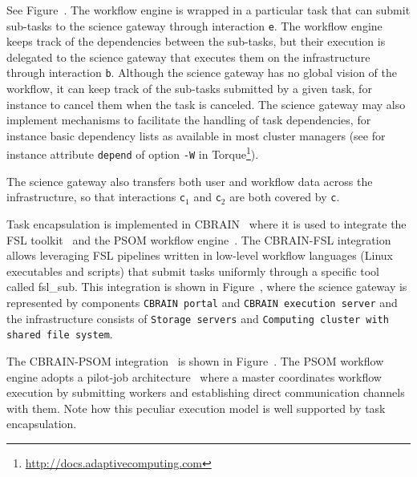 \documentclass[preprint,3p,twocolumn]{elsarticle}
\begin{document}
See Figure~. The workflow engine is wrapped in
a particular task that can submit sub-tasks to the science gateway
through interaction \texttt{e}. The workflow engine keeps track of the
dependencies between the sub-tasks, but their execution is delegated
to the science gateway that executes them on the infrastructure
through interaction \texttt{b}. Although the science gateway has no
global vision of the workflow, it can keep track of the sub-tasks
submitted by a given task, for instance to cancel them when
the task is canceled. The science gateway may also implement
mechanisms to facilitate the handling of task dependencies, for
instance basic dependency lists as available in most cluster managers
(see for instance attribute \texttt{depend} of option \texttt{-W} in
Torque\footnote{\url{http://docs.adaptivecomputing.com}}).

The science gateway also transfers both user and workflow data across
the infrastructure, so that interactions \texttt{c$_1$} and
\texttt{c$_2$} are both covered by \texttt{c}. 

Task encapsulation is implemented in CBRAIN~\cite{SHER-14} where it is
used to integrate the FSL toolkit~\cite{Jenkinson2012782} and the PSOM
workflow engine~\cite{bellec2012pipeline}. The CBRAIN-FSL integration
allows leveraging FSL pipelines written in low-level workflow
languages (Linux executables and scripts) that submit tasks uniformly
through a specific tool called fsl\_sub. This integration is shown in
Figure~, where the science gateway is
represented by components \texttt{CBRAIN portal} and \texttt{CBRAIN
  execution server} and the infrastructure consists of \texttt{Storage
  servers} and \texttt{Computing cluster with shared file system}.

The CBRAIN-PSOM integration~\cite{GLAT-16} is shown in
Figure~. The PSOM workflow engine
adopts a pilot-job architecture~\cite{turilli2015comprehensive} where
a master coordinates workflow execution by submitting workers and
establishing direct communication channels with them. Note how this
peculiar execution model is well supported by task encapsulation.
\end{document}
